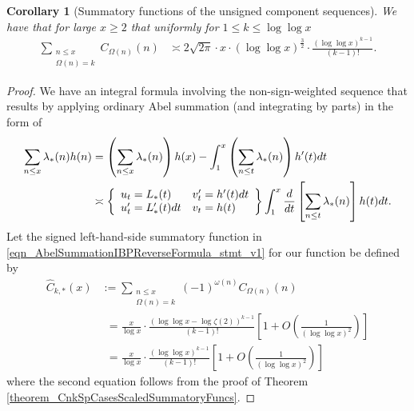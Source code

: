\documentclass[11pt,reqno,a4letter]{article}
\numberwithin{figure}{section}
\numberwithin{table}{section}
\theoremstyle{plain}
\newtheorem{cor}[theorem]{Corollary}
\numberwithin{theorem}{section}
\theoremstyle{definition}
\begin{document}
\begin{cor}[Summatory functions of the unsigned component sequences] 
\label{cor_SummatoryFuncsOfUnsignedSeqs_v2} 
We have that for large $x \geq 2$ that uniformly for $1 \leq k \leq \log\log x$ 
\begin{align*} 
\sum_{\substack{n \leq x \\ \Omega(n) = k}} C_{\Omega(n)}(n) & \asymp 
     2\sqrt{2\pi} \cdot x \cdot (\log\log x)^{\frac{3}{2}} \cdot 
     \frac{(\log\log x)^{k-1}}{(k-1)!}. 
\end{align*} 
\end{cor} 
\begin{proof} 
We have an integral formula involving the non-sign-weighted 
sequence that results by 
applying ordinary Abel summation (and integrating by parts) in the form of 
\begin{align} 
\label{eqn_AbelSummationIBPReverseFormula_stmt_v1} 
\sum_{n \leq x} \lambda_{\ast}(n) h(n) & = \left(\sum_{n \leq x} \lambda_{\ast}(n)\right) h(x) - 
     \int_{1}^{x} \left(\sum_{n \leq t} \lambda_{\ast}(n)\right) h^{\prime}(t) dt \\ 
\notag 
     & \asymp \left\{\begin{array}{ll} 
     u_t = L_{\ast}(t) & v_t^{\prime} = h^{\prime}(t) dt \\ 
     u_t^{\prime} = L_{\ast}^{\prime}(t) dt & v_t = h(t) 
     \end{array} 
     \right\} 
     \int_1^{x} \frac{d}{dt}\left[\sum_{n \leq t} \lambda_{\ast}(n)\right] h(t) dt. 
\end{align} 
Let the signed left-hand-side summatory function in 
\eqref{eqn_AbelSummationIBPReverseFormula_stmt_v1} for our function be defined by 
\begin{align*} 
\widehat{C}_{k,\ast}(x) & := \sum_{\substack{n \leq x \\ \Omega(n)=k}} 
     (-1)^{\omega(n)} C_{\Omega(n)}(n) \\ 
     & \phantom{:} = 
     \frac{x}{\log x} \cdot \frac{(\log\log x - \log\zeta(2))^{k-1}}{(k-1)!} \left[ 
     1 + O\left(\frac{1}{(\log\log x)^2}\right)\right] \\ 
     & \phantom{:} = 
     \frac{x}{\log x} \cdot \frac{(\log\log x)^{k-1}}{(k-1)!} \left[ 
     1 + O\left(\frac{1}{(\log\log x)^2}\right)\right]
\end{align*} 
where the second equation follows from the proof of 
Theorem \ref{theorem_CnkSpCasesScaledSummatoryFuncs}. 


\end{proof}
\end{document}
